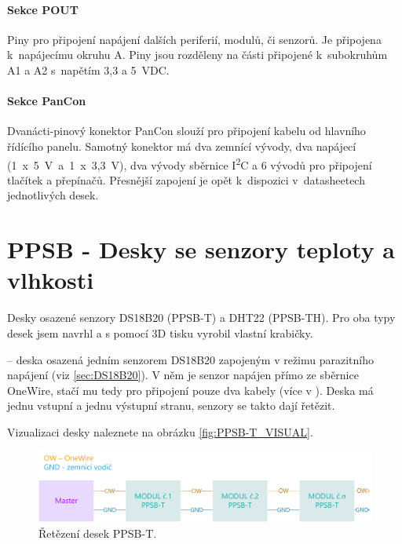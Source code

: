 \paragraph{Sekce POUT} 
Piny pro připojení napájení dalších periferií, modulů, či senzorů.
Je připojena k~napájecímu okruhu A.
Piny jsou rozděleny na části připojené k~subokruhům A1 a A2 s~napětím 3,3 a 5~VDC.

\paragraph{Sekce PanCon}
Dvanácti-pinový konektor PanCon slouží pro připojení kabelu od hlavního řídícího panelu. 
Samotný konektor má dva zemnící vývody, dva napájecí (1~x~5~V~a~1~x~3,3~V), dva vývody sběrnice I\textsuperscript{2}C a 6 vývodů pro připojení tlačítek a přepínačů.
Přesnější zapojení je opět k~dispozici v~datasheetech jednotlivých desek.

\section{PPSB - Desky se senzory teploty a vlhkosti}
Desky osazené senzory DS18B20\cite{DS18B20} (PPSB-T) a DHT22\cite{DHT22} (PPSB-TH).
Pro oba typy desek jsem navrhl a s pomocí 3D tisku vyrobil vlastní krabičky.\newline

\noindent{} -- deska osazená jedním senzorem DS18B20 \cite{DS18B20} zapojeným v režimu parazitního napájení (viz \autoref{sec:DS18B20}).
V něm je senzor napájen přímo ze sběrnice OneWire, stačí mu tedy pro připojení pouze dva kabely (více v \cite{DS18B20}).
Deska má jednu vstupní a jednu výstupní stranu, senzory se takto dají řetězit.

Vizualizaci desky naleznete na obrázku \ref{fig:PPSB-T_VISUAL}.\newline \newline

\begin{figure}[h]
    \centering
   \includegraphics[width=\textwidth]{img/HARDWARE/PPSB-T_CHAIN.png}
   \caption{Řetězení desek PPSB-T.}
   \label{fig:PPSB-T_wiring}
\end{figure}

